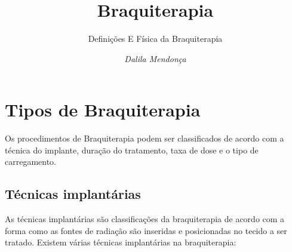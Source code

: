 \documentclass[11pt,a4paper]{article}
\title{Braquiterapia}
\author{Definições E Física da Braquiterapia\nocite{*}}
\date{\textit{Dalila Mendonça}}
\begin{document}
	\maketitle



\section{Tipos de Braquiterapia}

	Os procedimentos de Braquiterapia podem ser classificados de acordo com a técnica do implante, duração do tratamento, taxa de dose e o tipo de carregamento.

\subsection{Técnicas implantárias}

	As técnicas implantárias são classificações da braquiterapia de acordo com a forma como as fontes de radiação são inseridas e posicionadas no tecido a ser tratado. Existem várias técnicas implantárias na braquiterapia:
\end{document}
